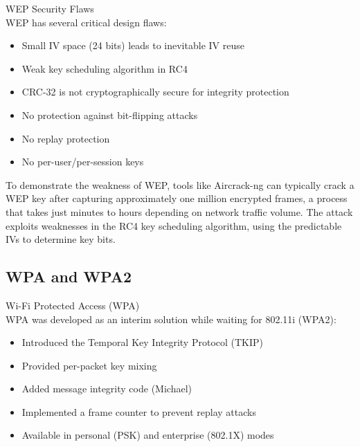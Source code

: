 \begin{theorem}{WEP Security Flaws}\\
WEP has several critical design flaws:
\begin{itemize}
    \item Small IV space (24 bits) leads to inevitable IV reuse
    \item Weak key scheduling algorithm in RC4
    \item CRC-32 is not cryptographically secure for integrity protection
    \item No protection against bit-flipping attacks
    \item No replay protection
    \item No per-user/per-session keys
\end{itemize}
\end{theorem}

\begin{example}
To demonstrate the weakness of WEP, tools like Aircrack-ng can typically crack a WEP key after capturing approximately one million encrypted frames, a process that takes just minutes to hours depending on network traffic volume. The attack exploits weaknesses in the RC4 key scheduling algorithm, using the predictable IVs to determine key bits.
\end{example}

\subsection{WPA and WPA2}

\begin{definition}{Wi-Fi Protected Access (WPA)}\\
WPA was developed as an interim solution while waiting for 802.11i (WPA2):
\begin{itemize}
    \item Introduced the Temporal Key Integrity Protocol (TKIP)
    \item Provided per-packet key mixing
    \item Added message integrity code (Michael)
    \item Implemented a frame counter to prevent replay attacks
    \item Available in personal (PSK) and enterprise (802.1X) modes
\end{itemize}
\end{definition}

